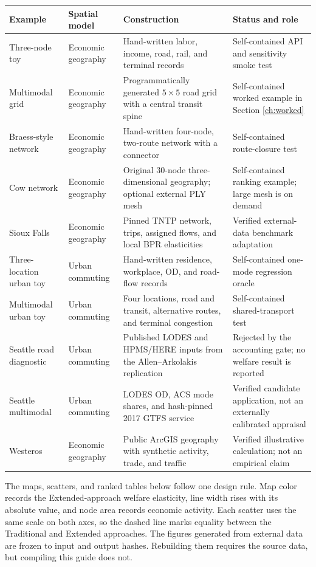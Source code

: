\begin{longtable}{L{0.15\textwidth}L{0.18\textwidth}L{0.29\textwidth}L{0.28\textwidth}}
\toprule
Example & Spatial model & Construction & Status and role \\
\midrule
\endhead
Three-node toy & Economic geography & Hand-written labor, income, road, rail,
and terminal records & Self-contained API and sensitivity smoke test \\
Multimodal grid & Economic geography & Programmatically generated \(5\times5\)
road grid with a central transit spine & Self-contained worked example in
Section \ref{ch:worked} \\
Braess-style network & Economic geography & Hand-written four-node, two-route
network with a connector & Self-contained route-closure test \\
Cow network & Economic geography & Original 30-node three-dimensional
geography; optional external PLY mesh & Self-contained ranking example; large
mesh is on demand \\
Sioux Falls & Economic geography & Pinned TNTP network, trips, assigned flows,
and local BPR elasticities & Verified external-data benchmark adaptation \\
Three-location urban toy & Urban commuting & Hand-written residence,
workplace, OD, and road-flow records & Self-contained one-mode regression
oracle \\
Multimodal urban toy & Urban commuting & Four locations, road and transit,
alternative routes, and terminal congestion & Self-contained shared-transport
test \\
Seattle road diagnostic & Urban commuting & Published LODES and HPMS/HERE
inputs from the Allen--Arkolakis replication & Rejected by the accounting
gate; no welfare result is reported \\
Seattle multimodal & Urban commuting & LODES OD, ACS mode shares, and
hash-pinned 2017 GTFS service & Verified candidate application, not an
externally calibrated appraisal \\
Westeros & Economic geography & Public ArcGIS geography with synthetic
activity, trade, and traffic & Verified illustrative calculation; not an
empirical claim \\
\bottomrule
\end{longtable}

The maps, scatters, and ranked tables below follow one design rule. Map color
records the Extended-approach welfare elasticity, line width rises with its
absolute value, and node area records economic activity. Each scatter uses the
same scale on both axes, so the dashed line marks equality between the
Traditional and Extended approaches. The figures generated from external data
are frozen to input and output hashes. Rebuilding them requires the source data,
but compiling this guide does not.

